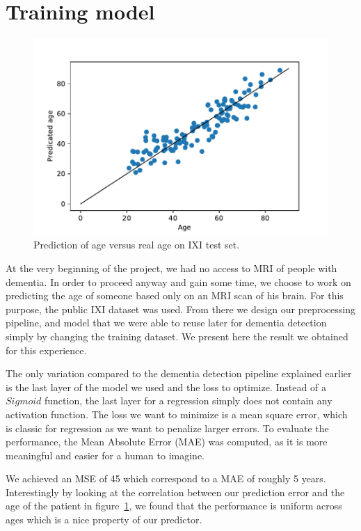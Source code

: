 \section{Training model}

\begin{figure}
 \centering
 \includegraphics[width=.9\linewidth]{figures/Age_pred_vs_age_IXI.pdf}
 \captionsetup{width=.9\linewidth}
 \caption{Prediction of age versus real age on IXI test set.}
 \label{fig:IXI_pred_vs_age}
\end{figure}

At the very beginning of the project, we had no access to MRI of people with dementia. In order to proceed anyway and gain some time, we choose to work on predicting the age of someone based only on an MRI scan of his brain. For this purpose, the public IXI dataset was used. From there we design our preprocessing pipeline, and model that we were able to reuse later for dementia detection simply by changing the training dataset. We present here the result we obtained for this experience.

The only variation compared to the dementia detection pipeline explained earlier is the last layer of the model we used and the loss to optimize. Instead of a $Sigmoid$ function, the last layer for a regression simply does not contain any activation function. The loss we want to minimize is a mean square error, which is classic for regression as we want to penalize larger errors. To evaluate the performance, the Mean Absolute Error (MAE) was computed, as it is more meaningful and easier for a human to imagine.


We achieved an MSE of 45 which correspond to a MAE of roughly 5 years. Interestingly by looking at the correlation between our prediction error and the age of the patient in figure~\ref{fig:IXI_pred_vs_age}, we found that the performance is uniform across ages which is a nice property of our predictor.

